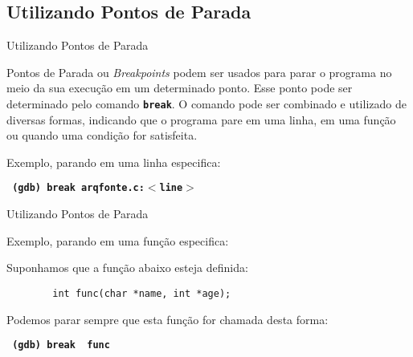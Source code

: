 \subsection{ Utilizando Pontos de Parada }
\frame{\tableofcontents[
    currentsection,
    currentsubsection,
    subsectionstyle=show/shaded/hide
]}
\begin{frame}{Utilizando Pontos de Parada}

    Pontos de Parada ou \textit{Breakpoints} podem ser usados para parar o programa no meio da sua execução em um determinado ponto. Esse ponto pode ser determinado pelo comando \texttt{\textbf{{\color{blue}break}}}. O comando pode ser combinado e utilizado de diversas formas, indicando que o programa pare em uma linha, em uma função ou quando uma condição for satisfeita.
    
    Exemplo, parando em uma linha especifica:
    
    \begin{center}
        \small
        \texttt{ \textbf{ (gdb) {\color{blue}break}  {\color{black}arqfonte}{\color{red}.c}:$<${\color{dartmouthgreen}line}$>$ }}
    \end{center}
\end{frame}

\begin{frame}[fragile]{Utilizando Pontos de Parada}

    Exemplo, parando em uma função especifica:
    
    Suponhamos que a função abaixo esteja definida:
    
    \begin{lstlisting}
        int func(char *name, int *age);
    \end{lstlisting}
    
    Podemos parar sempre que esta função for chamada desta forma:
    \begin{center}
        \small
        \texttt{ \textbf{ (gdb) {\color{blue}break} {\color{red} func} } }
    \end{center}
\end{frame}

